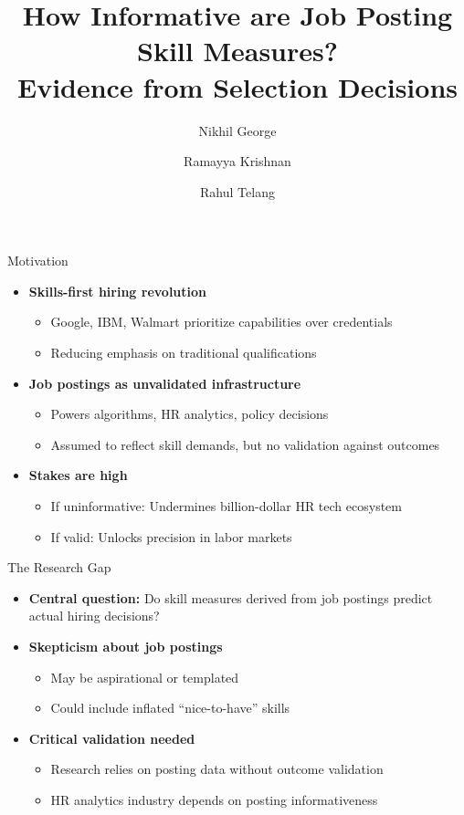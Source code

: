 \documentclass{beamer}
\title[Job Posting Skill Measures]{How Informative are Job Posting Skill Measures?\\Evidence from Selection Decisions}
\author{Nikhil George \and Ramayya Krishnan \and Rahul Telang}
\institute{Carnegie Mellon University}
\date{}
\begin{document}
\begin{frame}
\titlepage
\end{frame}

\begin{frame}{Motivation}
\begin{itemize}
    \item \textbf{Skills-first hiring revolution}
    \begin{itemize}
        \item Google, IBM, Walmart prioritize capabilities over credentials
        \item Reducing emphasis on traditional qualifications
    \end{itemize}
    \item \textbf{Job postings as unvalidated infrastructure}
    \begin{itemize}
        \item Powers algorithms, HR analytics, policy decisions
        \item Assumed to reflect skill demands, but no validation against outcomes
    \end{itemize}
    \item \textbf{Stakes are high}
    \begin{itemize}
        \item If uninformative: Undermines billion-dollar HR tech ecosystem
        \item If valid: Unlocks precision in labor markets
    \end{itemize}
\end{itemize}
\end{frame}

\begin{frame}{The Research Gap}
\begin{itemize}
    \item \textbf{Central question:} Do skill measures derived from job postings predict actual hiring decisions?
    \item \textbf{Skepticism about job postings}
    \begin{itemize}
        \item May be aspirational or templated
        \item Could include inflated ``nice-to-have'' skills
    \end{itemize}
    \item \textbf{Critical validation needed}
    \begin{itemize}
        \item Research relies on posting data without outcome validation
        \item HR analytics industry depends on posting informativeness
    \end{itemize}
\end{itemize}
\end{frame}
\end{document}
